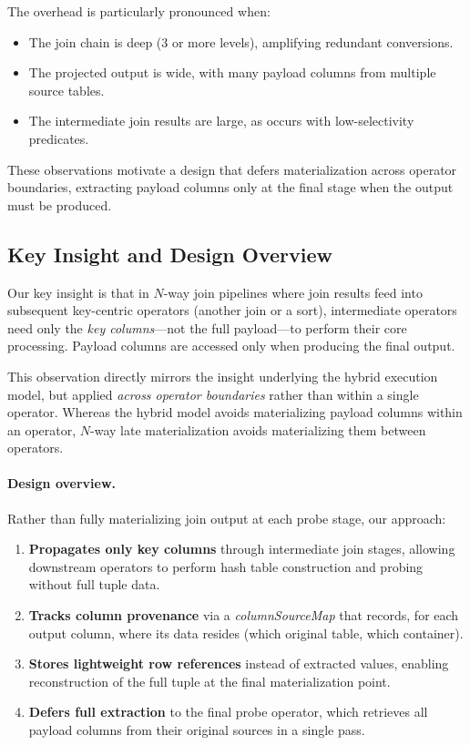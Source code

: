 The overhead is particularly pronounced when:
\begin{itemize}[leftmargin=*]
  \item The join chain is deep (3 or more levels), amplifying redundant conversions.
  \item The projected output is wide, with many payload columns from multiple source tables.
  \item The intermediate join results are large, as occurs with low-selectivity predicates.
\end{itemize}

These observations motivate a design that defers materialization across operator boundaries, extracting payload columns only at the final stage when the output must be produced.


\subsection{Key Insight and Design Overview}

Our key insight is that in $N$-way join pipelines where join results feed into subsequent key-centric operators (another join or a sort), intermediate operators need only the \emph{key columns}—not the full payload—to perform their core processing.
Payload columns are accessed only when producing the final output.

This observation directly mirrors the insight underlying the hybrid execution model, but applied \emph{across operator boundaries} rather than within a single operator.
Whereas the hybrid model avoids materializing payload columns within an operator, $N$-way late materialization avoids materializing them between operators.

\paragraph{Design overview.}
Rather than fully materializing join output at each probe stage, our approach:
\begin{enumerate}[leftmargin=*]
  \item \textbf{Propagates only key columns} through intermediate join stages, allowing downstream operators to perform hash table construction and probing without full tuple data.
  \item \textbf{Tracks column provenance} via a \emph{columnSourceMap} that records, for each output column, where its data resides (which original table, which container).
  \item \textbf{Stores lightweight row references} instead of extracted values, enabling reconstruction of the full tuple at the final materialization point.
  \item \textbf{Defers full extraction} to the final probe operator, which retrieves all payload columns from their original sources in a single pass.
\end{enumerate}

